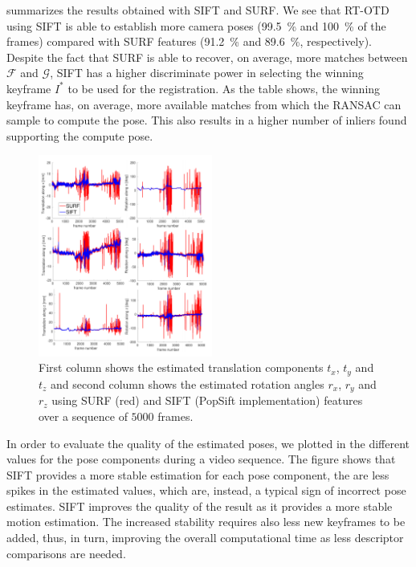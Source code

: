  summarizes the results obtained with SIFT and SURF. We see that RT-OTD using SIFT is able to establish more camera poses (\SI{99.5}{\percent} and \SI{100}{\percent} of the frames) compared with SURF features (\SI{91.2}{\percent} and \SI{89.6}{\percent}, respectively).
Despite the fact that SURF is able to recover, on average, more matches between $\mathcal{F}$ and $\mathcal{G}$, SIFT has a higher discriminate power in selecting the winning keyframe $I^*$ to be used for the registration. As the table shows, the winning keyframe has, on average, more available matches from which the RANSAC can sample to compute the pose. This also results in a higher number of inliers found supporting the compute pose.
\begin{figure}[t]
  \centering
  \includegraphics[width=0.51\textwidth]{./figs/Stability_Features.pdf}
\caption{First column shows the estimated translation components $t_x$, $t_y$ and $t_z$ and second column shows the estimated rotation angles $r_x$, $r_y$ and $r_z$ using SURF (red) and SIFT (PopSift implementation) features over a sequence of $5000$ frames.}
\label{fig:SurfVsSift}
\end{figure}
In order to evaluate the quality of the estimated poses, we plotted in  the different values for the pose components during a video sequence. The figure shows that SIFT provides a more stable estimation for each pose component, \ie the are less spikes in the estimated values, which are, instead, a typical sign of incorrect pose estimates. SIFT improves the quality of the result as it provides a more stable motion estimation. The increased stability requires also less new keyframes to be added, thus, in turn, improving the overall computational time as less descriptor comparisons are needed. 
